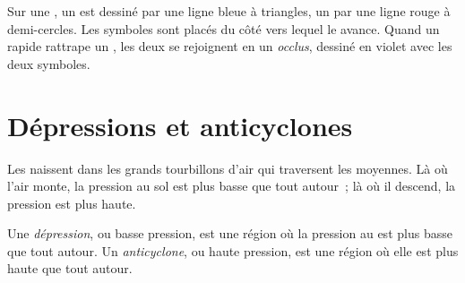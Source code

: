Sur une  , un  est dessiné par une ligne
bleue à triangles, un  par une ligne rouge à demi-cercles. Les
symboles sont placés du côté vers lequel le  avance. Quand un  rapide rattrape un , les deux se rejoignent en un
\emph{ occlus}, dessiné en violet avec les deux symboles.

\section{Dépressions et anticyclones}

Les  naissent dans les grands tourbillons d'air qui traversent les
 moyennes. Là où l'air monte, la pression au sol est plus basse
que tout autour~; là où il descend, la pression est plus haute.

\begin{definition}\label{def:g8:fronts-and-weather-maps:depression}
Une \emph{dépression}, ou basse
pression, est une région où la pression au  est plus basse
que tout autour. Un \emph{anticyclone}, ou haute
pression, est une région où elle est plus haute que tout autour.
\end{definition}
\label{def:g8:fronts-and-weather-maps:anticyclone}

